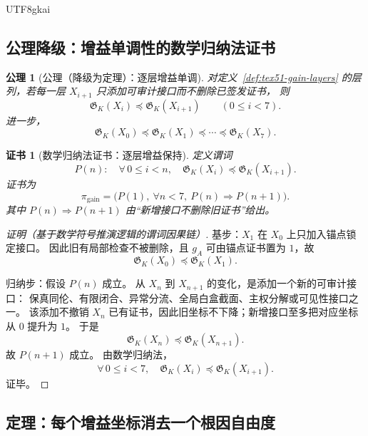 \documentclass[12pt]{article}
\newtheorem{axiom}{公理}[section]
\newtheorem{Certificate}{证书}[section]
\begin{document}
\begin{CJK*}{UTF8}{gkai}
\subsection{公理降级：增益单调性的数学归纳法证书}
\label{subsec:tex51-gain-monotone}

\begin{axiom}[公理（降级为定理）：逐层增益单调]
\label{ax:tex51-gain-monotone}
对定义~\ref{def:tex51-gain-layers} 的层列，若每一层 \(X_{i+1}\) 只添加可审计接口而不删除已签发证书，
则
\[
  \mathfrak G_K(X_i)\preceq \mathfrak G_K(X_{i+1})
  \qquad(0\le i<7).
\]
进一步，
\[
  \mathfrak G_K(X_0)
  \preceq
  \mathfrak G_K(X_1)
  \preceq
  \cdots
  \preceq
  \mathfrak G_K(X_7).
\]
\end{axiom}

\begin{Certificate}[数学归纳法证书：逐层增益保持]
\label{cert:tex51-gain-monotone}
定义谓词
\[
  P(n):\quad
  \forall\,0\le i<n,\quad
  \mathfrak G_K(X_i)\preceq \mathfrak G_K(X_{i+1}).
\]
证书为
\[
  \pi_{\mathrm{gain}}
  =
  \bigl(P(1),\ \forall n<7,\ P(n)\Rightarrow P(n+1)\bigr).
\]
其中 \(P(n)\Rightarrow P(n+1)\) 由“新增接口不删除旧证书”给出。
\end{Certificate}

\begin{proof}[证明（基于数学符号推演逻辑的谓词因果链）]
基步：\(X_1\) 在 \(X_0\) 上只加入锚点锁定接口。
因此旧有局部检查不被删除，且 \(g_A\) 可由锚点证书置为 \(1\)，故
\[
  \mathfrak G_K(X_0)\preceq\mathfrak G_K(X_1).
\]

归纳步：假设 \(P(n)\) 成立。
从 \(X_n\) 到 \(X_{n+1}\) 的变化，是添加一个新的可审计接口：
保真同伦、有限闭合、异常分流、全局白盒截面、主权分解或可见性接口之一。
该添加不撤销 \(X_n\) 已有证书，因此旧坐标不下降；新增接口至多把对应坐标从 \(0\) 提升为 \(1\)。
于是
\[
  \mathfrak G_K(X_n)\preceq\mathfrak G_K(X_{n+1}).
\]
故 \(P(n+1)\) 成立。
由数学归纳法，
\[
  \forall\,0\le i<7,\quad
  \mathfrak G_K(X_i)\preceq\mathfrak G_K(X_{i+1}).
\]
证毕。
\end{proof}

\subsection{定理：每个增益坐标消去一个根因自由度}
\label{subsec:tex51-gain-removes-root}


\end{CJK*}
\end{document}
